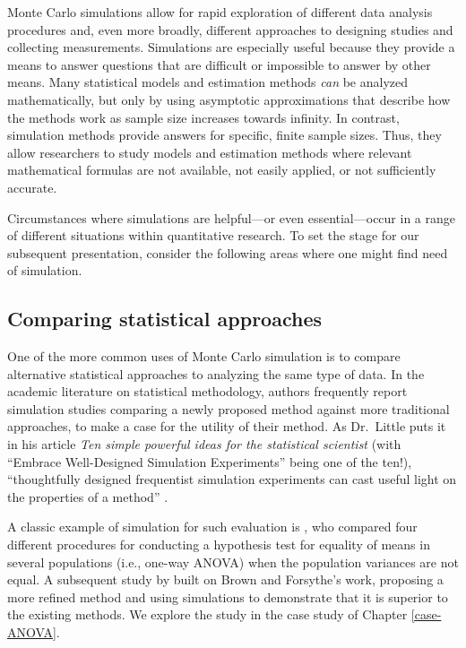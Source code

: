 \documentclass[
]{book}
\begin{document}
Monte Carlo simulations allow for rapid exploration of different data analysis procedures and, even more broadly, different approaches to designing studies and collecting measurements. Simulations are especially useful because they provide a means to answer questions that are difficult or impossible to answer by other means.
Many statistical models and estimation methods \emph{can} be analyzed mathematically, but only by using asymptotic approximations that describe how the methods work as sample size increases towards infinity.
In contrast, simulation methods provide answers for specific, finite sample sizes.
Thus, they allow researchers to study models and estimation methods where relevant mathematical formulas are not available, not easily applied, or not sufficiently accurate.

Circumstances where simulations are helpful---or even essential---occur in a range of different situations within quantitative research.
To set the stage for our subsequent presentation, consider the following areas where one might find need of simulation.

\subsection{Comparing statistical approaches}\label{comparing-statistical-approaches}

One of the more common uses of Monte Carlo simulation is to compare alternative statistical approaches to analyzing the same type of data.
In the academic literature on statistical methodology, authors frequently report simulation studies comparing a newly proposed method against more traditional approaches, to make a case for the utility of their method.
As Dr.~Little puts it in his article \emph{Ten simple powerful ideas for the statistical scientist} (with ``Embrace Well-Designed Simulation Experiments'' being one of the ten!), ``thoughtfully designed frequentist simulation experiments can cast useful light on the properties of a method'' \citep{little2013praise}.

A classic example of simulation for such evaluation is \citet{brown1974SmallSampleBehavior}, who compared four different procedures for conducting a hypothesis test for equality of means in several populations (i.e., one-way ANOVA) when the population variances are not equal.
A subsequent study by \citet{mehrotra1997ImprovingBrownforsytheSolution} built on Brown and Forsythe's work, proposing a more refined method and using simulations to demonstrate that it is superior to the existing methods.
We explore the \citet{brown1974SmallSampleBehavior} study in the case study of Chapter \ref{case-ANOVA}.
\end{document}
